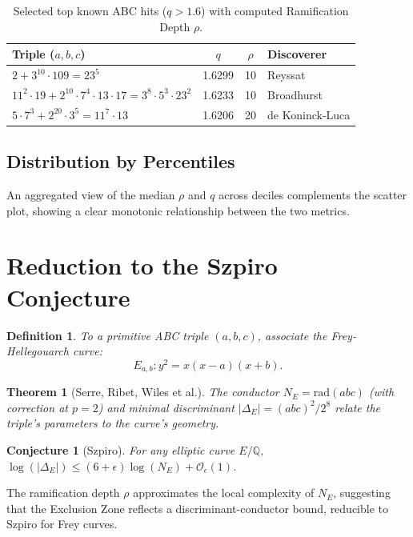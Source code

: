 \documentclass[11pt,a4paper]{article}
\newtheorem{definition}{Definition}[section]
\newtheorem{conjecture}{Conjecture}[section]
\newtheorem{theorem}{Theorem}[section]
\newcommand{\Q}{\mathbb{Q}}
\newcommand{\rad}{\mathrm{rad}}
\begin{document}
\begin{table}[h!]
\centering
\caption{Selected top known ABC hits (\(q > 1.6\)) with computed Ramification Depth \(\rho\).}
\begin{tabular}{l c c l}
\toprule
Triple (\(a,b,c\)) & \(q\) & \(\rho\) & Discoverer \\
\midrule
\(2 + 3^{10} \cdot 109 = 23^5\) & 1.6299 & 10 & Reyssat \\
\(11^2 \cdot 19 + 2^{10} \cdot 7^4 \cdot 13 \cdot 17 = 3^8 \cdot 5^3 \cdot 23^2\) & 1.6233 & 10 & Broadhurst \\
\(5 \cdot 7^3 + 2^{20} \cdot 3^5 = 11^7 \cdot 13\) & 1.6206 & 20 & de Koninck-Luca \\
\bottomrule
\end{tabular}
\label{tab:top-hits}
\end{table}

\subsection{Distribution by Percentiles}
An aggregated view of the median \(\rho\) and \(q\) across deciles complements the scatter plot, showing a clear monotonic relationship between the two metrics.

\section{Reduction to the Szpiro Conjecture}

\begin{definition}
To a primitive ABC triple \((a,b,c)\), associate the Frey-Hellegouarch curve:
\[
E_{a,b}: y^2 = x(x-a)(x+b).
\]
\end{definition}

\begin{theorem}[Serre, Ribet, Wiles et al.]
The conductor \(N_E = \rad(abc)\) (with correction at \(p=2\)) and minimal discriminant \(|\Delta_E| = (abc)^2 / 2^8\) relate the triple's parameters to the curve's geometry.
\end{theorem}

\begin{conjecture}[Szpiro]
For any elliptic curve \(E/\Q\), \(\log(|\Delta_E|) \leq (6+\epsilon)\log(N_E) + \mathcal{O}_\epsilon(1)\).
\end{conjecture}

The ramification depth \(\rho\) approximates the local complexity of \(N_E\), suggesting that the Exclusion Zone reflects a discriminant-conductor bound, reducible to Szpiro for Frey curves.
\end{document}
